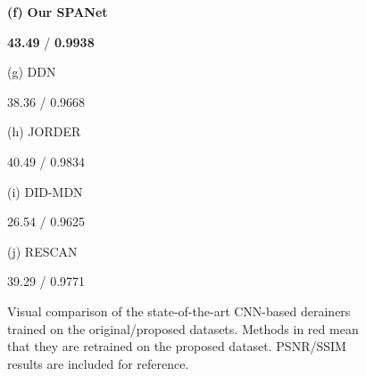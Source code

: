 \documentclass[10pt,twocolumn,letterpaper]{article}
\newcommand{\red}[1]{\textcolor[rgb]{1,0,0}{#1}}
\begin{document}
\begin{figure*}[t]
\begin{minipage}[t]{0.17\linewidth}
\centerline{\footnotesize \textbf{(f)} { \textbf{Our SPANet}}}
\centerline{\footnotesize \textbf{43.49} / \textbf{0.9938}}
\end{minipage}
\centering
\begin{minipage}[t]{0.17\textwidth}
\centerline{\footnotesize (g) {\color[HTML]{FF0000}DDN}~\cite{fu:cvpe:2017:ddn}}
\centerline{\footnotesize 38.36 / 0.9668 }
\end{minipage}
\centering
\begin{minipage}[t]{0.17\textwidth}
\centerline{\footnotesize (h) {\color[HTML]{FF0000}JORDER}~\cite{yang:cvpr:2017:j}}
\centerline{\footnotesize 40.49 / 0.9834}
\end{minipage}
\centering
\begin{minipage}[t]{0.17\textwidth}
\centerline{\footnotesize (i) {\color[HTML]{FF0000}DID-MDN}~\cite{zhang:cvpr:2018:did}}
\centerline{\footnotesize 26.54 / 0.9625}
\end{minipage}
\begin{minipage}[t]{0.17\textwidth}
\centerline{\footnotesize (j) {\color[HTML]{FF0000}RESCAN}~\cite{li:eccv:2018:rsecan}}
\centerline{\footnotesize 39.29 / 0.9771}
\end{minipage}
\vspace{1.5mm}
\caption{Visual comparison of the state-of-the-art CNN-based derainers trained on the original/proposed datasets. Methods in \red{red} mean that they are retrained on the proposed dataset. PSNR/SSIM results are included for reference.}
\label{fig:dataset}
\end{figure*}
\end{document}
